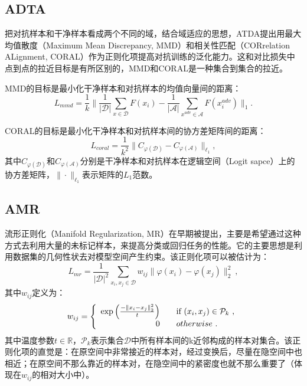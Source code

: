 \subsection{ADTA}

把对抗样本和干净样本看成两个不同的域，结合域适应的思想，ATDA提出用最大均值散度（Maximum Mean Discrepancy, MMD）\cite{borgwardt2006integrating}和相关性匹配（CORrelation ALignment, CORAL）\cite{sun2016deep}作为正则化项提高对抗训练的泛化能力\cite{song2018improving}。这和对比损失中点到点的拉近目标是有所区别的，MMD和CORAL是一种集合到集合的拉近。

MMD的目标是最小化干净样本和对抗样本的均值向量间的距离：
\begin{equation}
    L_{mmd} 
    = 
    \frac{1}{k} \Big\| \frac{1}{|\mathcal{D}|} \sum_{x\in\mathcal{D}}F(x_i) - \frac{1}{|\mathcal{A}|} \sum_{x^{adv}\in\mathcal{A}}F(x_i^{adv}) \Big\|_1 
    .
\end{equation}

CORAL的目标是最小化干净样本和对抗样本间的协方差矩阵间的距离：
\begin{equation}
    L_{coral} 
    = 
    \frac{1}{k^2} \Big\| C_{\varphi(\mathcal{D})} -  C_{\varphi(\mathcal{A})} \Big\|_{\ell_1} 
    ,
\end{equation}
其中$C_{\varphi(\mathcal{D})}$和$C_{\varphi(\mathcal{A})}$分别是干净样本和对抗样本在逻辑空间（Logit sapce）上的协方差矩阵，$\| \cdot \|_{\ell_1}$表示矩阵的$L_1$范数。

\subsection{AMR}

流形正则化（Manifold Regularization, MR）在早期被提出，主要是希望通过这种方式去利用大量的未标记样本，来提高分类或回归任务的性能。它的主要思想是利用数据集的几何性状去对模型空间产生约束。该正则化项可以被估计为\cite{belkin2006manifold}：
\begin{equation}
    L_{mr}
    = 
    \frac{1}{|\mathcal{D}|^2} \sum_{x_i, x_j \in \mathcal{D}} w_{ij}\big\|\varphi(x_i) - \varphi(x_j)\big\|_2^2
    \ ,
\end{equation}
其中$w_{ij}$定义为：
\begin{equation}
    w_{ij} = \left\{
    \begin{array}{rl}
    \exp \left(\frac{-\left\|x_i-x_j\right\|_2^2}{t}\right)  & \quad \textnormal{if } (x_i, x_j) \in \mathcal{P}_{k} \ ,\\
    0  & \quad otherwise \ .
    \end{array} \right.
\end{equation}
其中温度参数$t \in \mathbb{R}$，$\mathcal{P}_{k}$表示集合$\mathcal{D}$中所有样本间的k近邻构成的样本对集合。该正则化项的直觉是：在原空间中非常接近的样本对，经过变换后，尽量在隐空间中也相近；在原空间不那么靠近的样本对，在隐空间中的紧密度也就不那么重要了（体现在$w_{ij}$的相对大小中）。

